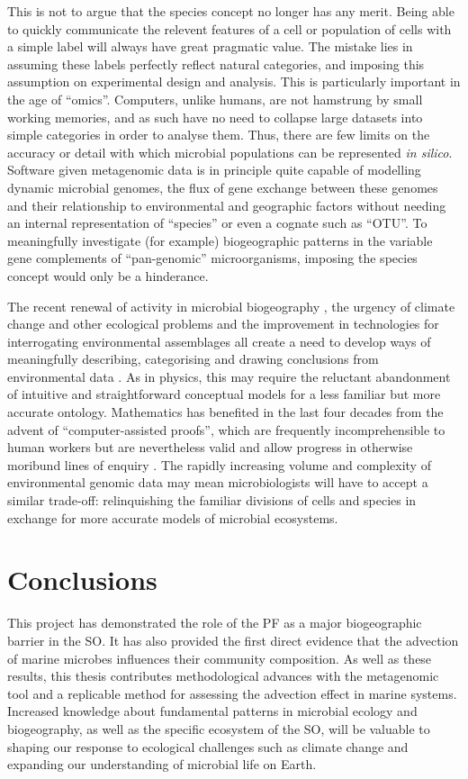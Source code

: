 This is not to argue that the species concept no longer has any merit.
Being able to quickly communicate the relevent features of a cell or population of cells with a simple label will always have great pragmatic value.
The mistake lies in assuming these labels perfectly reflect natural categories, and imposing this assumption on experimental design and analysis.
This is particularly important in the age of ``omics''.
Computers, unlike humans, are not hamstrung by small working memories, and as such have no need to collapse large datasets into simple categories in order to analyse them.
Thus, there are few limits on the accuracy or detail with which microbial populations can be represented \textit{in silico}. 
Software given metagenomic data is in principle quite capable of modelling dynamic microbial genomes, the flux of gene exchange between these genomes and their relationship to environmental and geographic factors without needing an internal representation of ``species'' or even a cognate such as ``\ac{OTU}''.
To meaningfully investigate (for example) biogeographic patterns in the variable gene complements of ``pan-genomic'' microorganisms, imposing the species concept would only be a hinderance.

The recent renewal of activity in microbial biogeography \cite{Ramette:2006jo}, the urgency of climate change and other ecological problems and the improvement in technologies for interrogating environmental assemblages all create a need to develop ways of meaningfully describing, categorising and drawing conclusions from environmental data \cite{Goldenfeld:2007im}.
As in physics, this may require the reluctant abandonment of intuitive and straightforward conceptual models for a less familiar but more accurate ontology.
Mathematics has benefited in the last four decades from the advent of ``computer-assisted proofs'', which are frequently incomprehensible to human workers but are nevertheless valid and allow progress in otherwise moribund lines of enquiry \citep[most famously, the proof of the Kepler conjecture by][]{Hales:2005um}.
The rapidly increasing volume and complexity of environmental genomic data may mean microbiologists will have to accept a similar trade-off: relinquishing the familiar divisions of cells and species in exchange for more accurate models of microbial ecosystems.

\section{Conclusions}
This project has demonstrated the role of the \ac{PF} as a major biogeographic barrier in the \ac{SO}.
It has also provided the first direct evidence that the advection of marine microbes influences their community composition.
As well as these results, this thesis contributes methodological advances with the metagenomic tool  and a replicable method for assessing the advection effect in marine systems.
Increased knowledge about fundamental patterns in microbial ecology and biogeography, as well as the specific ecosystem of the \ac{SO}, will be valuable to shaping our response to ecological challenges such as climate change and expanding our understanding of microbial life on Earth.

